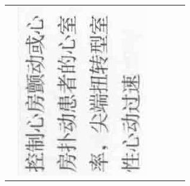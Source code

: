 \documentclass[10pt]{article}
\begin{document}
\begin{center}
\begin{tabular}{|c|c|c|c|c|c|}
 & \includegraphics[max width=\textwidth]{2024_07_05_645bb794a4d4f32ee0c8g-352}

\end{tabular}
\end{center}
\end{document}
